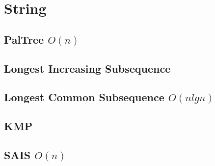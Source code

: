\documentclass[a4paper,10pt,twocolumn,oneside]{article}
\begin{document}
%

% 

\section{String}

\subsection{PalTree $O(n)$}


%

\subsection{Longest Increasing Subsequence}



\subsection{Longest Common Subsequence $O(nlgn)$}


\subsection{KMP}


\subsection{SAIS $O(n)$}


%
\end{document}
